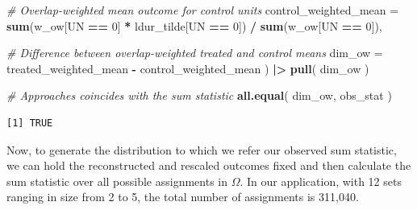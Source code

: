 \documentclass[
  12pt,
  leqno]{article}
\newenvironment{Shaded}{\begin{snugshade}}{\end{snugshade}}
\newcommand{\AttributeTok}[1]{\textcolor[rgb]{0.13,0.29,0.53}{#1}}
\newcommand{\CommentTok}[1]{\textcolor[rgb]{0.56,0.35,0.01}{\textit{#1}}}
\newcommand{\DecValTok}[1]{\textcolor[rgb]{0.00,0.00,0.81}{#1}}
\newcommand{\FunctionTok}[1]{\textcolor[rgb]{0.13,0.29,0.53}{\textbf{#1}}}
\newcommand{\NormalTok}[1]{#1}
\newcommand{\OtherTok}[1]{\textcolor[rgb]{0.56,0.35,0.01}{#1}}
\newcommand{\SpecialCharTok}[1]{\textcolor[rgb]{0.81,0.36,0.00}{\textbf{#1}}}
\newcommand{\StringTok}[1]{\textcolor[rgb]{0.31,0.60,0.02}{#1}}
\begin{document}
\begin{Shaded}
\begin{Highlighting}[]
    \CommentTok{\# Overlap{-}weighted mean outcome for control units}
    \AttributeTok{control\_weighted\_mean =}
      \FunctionTok{sum}\NormalTok{(w\_ow[UN }\SpecialCharTok{==} \DecValTok{0}\NormalTok{] }\SpecialCharTok{*}\NormalTok{ ldur\_tilde[UN }\SpecialCharTok{==} \DecValTok{0}\NormalTok{]) }\SpecialCharTok{/} \FunctionTok{sum}\NormalTok{(w\_ow[UN }\SpecialCharTok{==} \DecValTok{0}\NormalTok{]),}

    \CommentTok{\# Difference between overlap{-}weighted treated and control means}
    \AttributeTok{dim\_ow =}\NormalTok{ treated\_weighted\_mean }\SpecialCharTok{{-}}\NormalTok{ control\_weighted\_mean}
\NormalTok{  ) }\SpecialCharTok{|\textgreater{}}
  \FunctionTok{pull}\NormalTok{(}
\NormalTok{    dim\_ow}
\NormalTok{  )}

\CommentTok{\# Approaches coincides with the sum statistic}
\FunctionTok{all.equal}\NormalTok{(}
\NormalTok{  dim\_ow, obs\_stat}
\NormalTok{)}
\end{Highlighting}
\end{Shaded}

\begin{verbatim}
[1] TRUE
\end{verbatim}

\doublespacing

Now, to generate the distribution to which we refer our observed sum
statistic, we can hold the reconstructed and rescaled outcomes fixed and
then calculate the sum statistic over all possible assignments in
\(\Omega\). In our application, with 12 sets ranging in size from 2 to
5, the total number of assignments is 311,040.

\singlespacing

\begin{Shaded}
\end{Shaded}
\end{document}
